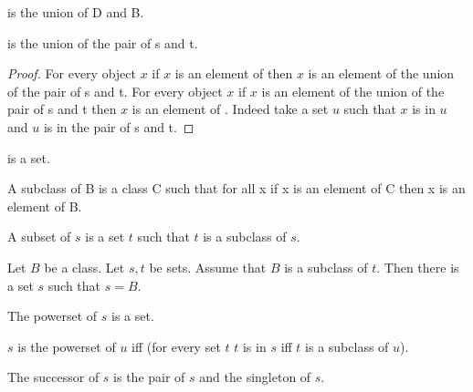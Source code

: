 \documentclass{article}
\begin{document}
\begin{forthel}
    \begin{definition}
       is the union of D and B.
    \end{definition}

    \begin{lemma}
       is the union of the pair of s and t.
    \end{lemma}
    \begin{proof}
      For every object $x$ if $x$ is an element of 
        then $x$ is an element of the union of the pair of s and t.
      For every object $x$ if $x$ is an element of the union of the pair of s and t
        then $x$ is an element of .
      Indeed take a set $u$ such that $x$ is in $u$ and $u$ is in the pair of s and t.
    \end{proof}

    \begin{lemma}
       is a set.
    \end{lemma}

    \begin{definition}
      A subclass of B is a class C such that
        for all x if x is an element of C then x is an element of B.
    \end{definition}

    \begin{definition}
      A subset of $s$ is a set $t$ 
        such that $t$ is a subclass of $s$.
    \end{definition}

    \begin{axiom}[Separation]
      Let $B$ be a class. Let $s, t$ be sets.
      Assume that $B$ is a subclass of $t$.
      Then there is a set $s$ such that $s = B$.
    \end{axiom}

    \begin{signature}
      The powerset of $s$ is a set.
    \end{signature}

    \begin{axiom}[PowerSet]
      $s$ is the powerset of $u$ iff (for every set $t$ $t$ is in $s$ iff $t$ is a subclass of $u$).
    \end{axiom}

    \begin{definition}
      The successor of $s$ is the pair of $s$ and the singleton of $s$.
    \end{definition}


\end{forthel}
\end{document}
